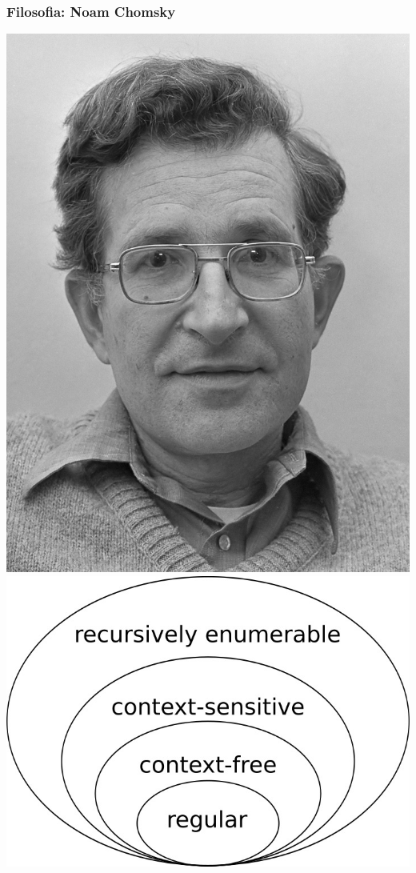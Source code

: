 \documentclass[xcolor=svgnames]{beamer}
\begin{document}
\begin{frame}\small\frametitle{Filosofia: Noam Chomsky}

  \includegraphics[height=0.5\textheight]{pictures/Noam_Chomsky_(1977).jpg} \hfill   \includegraphics[height=0.5\textheight]{pictures/Chomsky-hierarchy.jpg}


\end{frame}
\end{document}
